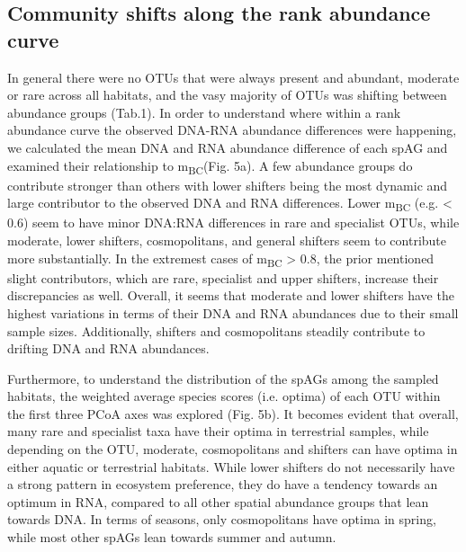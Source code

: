 \documentclass[12pt,a4paper]{article} %
\begin{document}
\subsection*{Community shifts along the rank abundance curve}
In general there were no OTUs that were always present and abundant, moderate or rare across all habitats, and the vasy majority of OTUs was shifting between abundance groups (Tab.1). In order to understand where within a rank abundance curve the observed DNA-RNA abundance differences were happening, we calculated the mean DNA and RNA abundance difference of each spAG and examined their relationship to m\textsubscript{BC}(Fig. 5a). A few abundance groups do contribute stronger than others with lower shifters being the most dynamic and large contributor to the observed DNA and RNA differences. Lower m\textsubscript{BC} (e.g. < 0.6) seem to have minor DNA:RNA differences in rare and specialist OTUs, while moderate, lower shifters, cosmopolitans, and general shifters seem to contribute more substantially. In the extremest cases of m\textsubscript{BC} > 0.8, the prior mentioned slight contributors, which are rare, specialist and upper shifters, increase their discrepancies as well. Overall, it seems that moderate and lower shifters have the highest variations in terms of their DNA and RNA abundances  due to their small sample sizes. Additionally, shifters and cosmopolitans steadily contribute to drifting DNA and RNA abundances.

Furthermore, to understand the distribution of the spAGs among the sampled habitats, the weighted average species scores (i.e. optima) of each OTU within the first three PCoA axes was explored (Fig. 5b). It becomes evident that overall, many rare and specialist taxa have their optima in terrestrial samples, while depending on the OTU, moderate, cosmopolitans and shifters can have optima in either aquatic or terrestrial habitats. While lower shifters do not necessarily have a strong pattern in ecosystem preference, they do have a tendency towards an optimum in RNA, compared to all other spatial abundance groups that lean towards DNA. In terms of seasons, only cosmopolitans have optima in spring, while most other spAGs lean towards summer and autumn.
\end{document}
